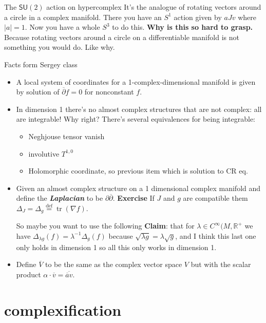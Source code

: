 \begin{thing7}{The \(\mathsf{SU}(2)\) action on hypercomplex}\leavevmode
It's the analogue of rotating vectors around a circle in a complex manifold. There you have an \(S^1\) action given by \(a Jv\) where \(|a|=1\). Now you have a whole  \(S^3\) to do this. \textbf{Why is this so hard to grasp.} Because rotating vectors around a circle on a differentiable manifold is not something you would do. Like why.
\end{thing7}

\begin{thing6}{Facts form Sergey class}\leavevmode
\begin{itemize}
	\item A local system of coordinates for a 1-complex-dimensional manifold is given by solution of  \(\overline{\partial}f=0\) for nonconstant \(f\).
	\item In dimension 1 there's no almost complex structures that are not complex: all are integrable! Why right? There's several equivalences for being integrable:
\begin{itemize}
\item Neghjouse tensor vanish
\item involutive \(T^{1,0}\) 
\item Holomorphic coordinate, so previous item which is solution to CR eq.
\end{itemize}
\item Given an almost complex structure on a 1 dimensional complex manifold and define the \textit{\textbf{Laplacian}} to be \(\partial \overline{\partial}\). \textbf{Exercise} If \(J\) and \(g\) are compatible them \(\Delta_J = \Delta_g\overset{\operatorname{def}}{=}\operatorname{tr}(\nabla f)\).

	So maybe you want to use the following \textbf{Claim}: that for \(\lambda \in C^\infty(M,\mathbb{R}^+\) we have \(\Delta_{\lambda g}(f)=\lambda^{-1}\Delta_g(f)\) because \(\sqrt{\lambda g}=\lambda \sqrt{g}  \), and I think this last one only holds in dimension 1 so all this only works in dimension 1.

\item Define \(\overline{V}\) to be the same as the complex vector space \(V\) but with the scalar product \(\alpha\cdot \overline{v}=\overline{\overline{a}v}\).
\end{itemize}
\end{thing6}


\section{complexification}

